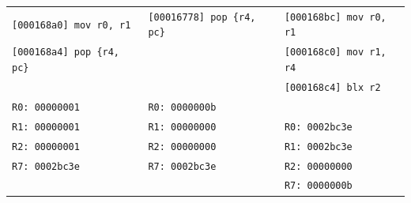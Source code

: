\documentclass[9pt]{beamer}
\begin{document}
\begin{frame}{}
\begin{center}
{\begin{tabular}{l l l}
        \texttt{[000168a0]  mov r0, r1}	& \texttt{[00016778]  pop \{r4, pc\}}			& \texttt{[000168bc]  mov r0, r1} \\
        \texttt{[000168a4]  pop \{r4, pc\}}	&							& \texttt{[000168c0]  mov r1, r4} \\
 					&							& \texttt{[000168c4]  blx r2} \\
\texttt{R0: 00000001}			& \texttt{R0: 0000000b}				& \\
\texttt{R1: 00000001}			& \texttt{R1: 00000000}				& \texttt{R0: 0002bc3e} \\
\texttt{R2: 00000001}			& \texttt{R2: 00000000}				& \texttt{R1: 0002bc3e} \\
\texttt{R7: 0002bc3e}				& \texttt{R7: 0002bc3e}				& \texttt{R2: 00000000} \\
					&							& \texttt{R7: 0000000b} \\ \hline
      \end{tabular}
    }
    
\end{center}
\end{frame}
\end{document}
